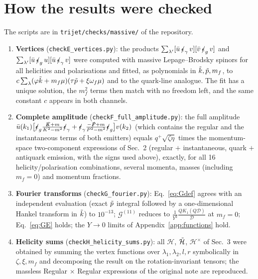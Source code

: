 \documentclass[9pt]{article}
\newcommand{\om}{\omega_{f}}                 %
\newcommand{\G}[1]{\mathcal{G}^{(#1)}}       %
\newcommand{\Hs}{\mathcal{H}}
\numberwithin{equation}{section}
\begin{document}
\section{How the results were checked}\label{app:checks}
The scripts are in \texttt{trijet/checks/massive/} of the repository.
\begin{enumerate}
    \item \textbf{Vertices} (\texttt{checkE\_vertices.py}): the products $\sum_{\lambda'}[\Bar{u}\,\slashed{\epsilon}_{\gamma}\,v][\Bar{v}\,\slashed{\epsilon}_{g}\,v]$ and $\sum_{\lambda'}[\Bar{u}\,\slashed{\epsilon}_{g}\,u][\Bar{u}\,\slashed{\epsilon}_{\gamma}\,v]$ were computed with massive Lepage--Brodsky spinors for all helicities and polarisations and fitted, as polynomials in $\Tilde{k},\Tilde{p},m_{f}$, to $c\sum_{\lambda}(\varphi\Tilde{k}+m_{f}\mu)(\tau\Tilde{p}+\xi\om\mu)$ and to the quark-line analogue. The fit has a unique solution, the $m^{2}_{f}$ terms then match with no freedom left, and the same constant $c$ appears in both channels.
    \item \textbf{Complete amplitude} (\texttt{checkF\_full\_amplitude.py}): the full amplitude $\Bar{u}(k_{1})\big[\slashed{\epsilon}_{g}\frac{\slashed{K}+m}{K^{2}-m^{2}}\slashed{\epsilon}_{\gamma}+\slashed{\epsilon}_{\gamma}\frac{-\slashed{P}+m}{P^{2}-m^{2}}\slashed{\epsilon}_{g}\big]v(k_{2})$ (which contains the regular and the instantaneous terms of both emitters) equals $q^{+}\sqrt{\zeta\eta}$ times the momentum-space two-component expressions of Sec.~2 (regular $+$ instantaneous, quark $+$ antiquark emission, with the signs used above), exactly, for all 16 helicity/polarisation combinations, several momenta, masses (including $m_{f}=0$) and momentum fractions.
    \item \textbf{Fourier transforms} (\texttt{checkG\_fourier.py}): Eq.~\eqref{eq:Gdef} agrees with an independent evaluation (exact $\Tilde{p}$ integral followed by a one-dimensional Hankel transform in $\Tilde{k}$) to $10^{-13}$; $\G{11}$ reduces to $\frac{1}{Y^{2}}\frac{QK_{1}(Q\mathcal{D})}{\mathcal{D}}$ at $m_{f}=0$; Eq.~\eqref{eq:GE} holds; the $Y\rightarrow 0$ limits of Appendix~\ref{app:functions} hold.
    \item \textbf{Helicity sums} (\texttt{checkH\_helicity\_sums.py}): all $\Hs$, $\Tilde{\Hs}$, $\Hs^{\times}$ of Sec.~3 were obtained by summing the vertex functions over $\lambda_{1},\lambda_{2},l,r$ symbolically in $\zeta,\xi,m_{f}$ and decomposing the result on the rotation-invariant tensors; the massless Regular $\times$ Regular expressions of the original note are reproduced.
\end{enumerate}
\end{document}
